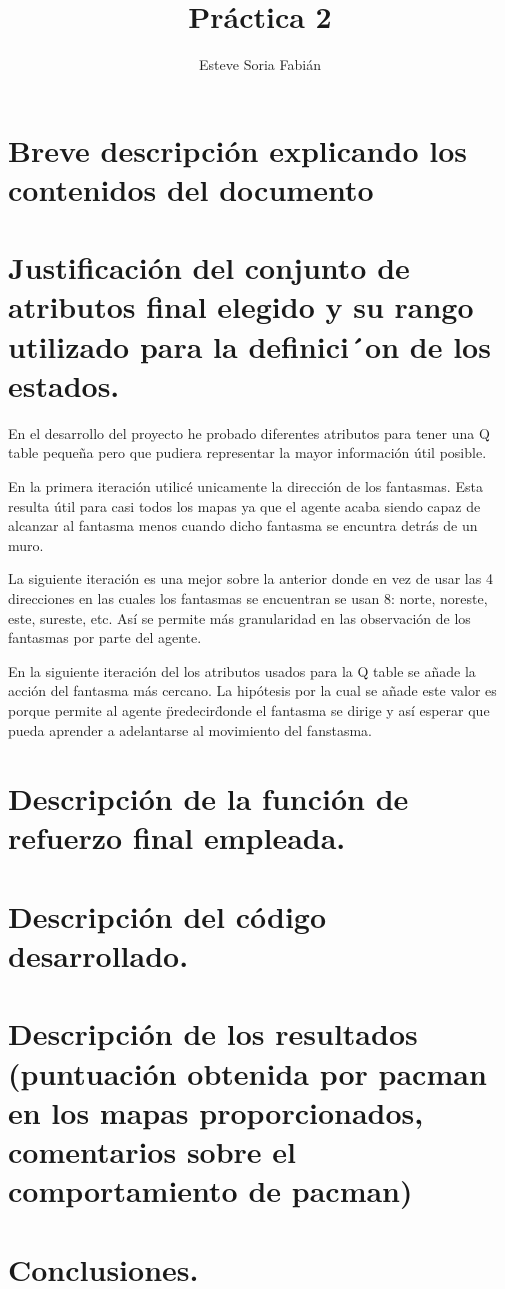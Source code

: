 \documentclass[12pt]{article}
\title{Práctica 2}
\author{Esteve Soria Fabián}
\begin{document}
    \maketitle


    \section{Breve descripción explicando los contenidos del documento}
    \section{Justificación del conjunto de atributos final elegido y su rango utilizado para la definici´on de los
    estados.}

    En el desarrollo del proyecto he probado diferentes atributos para tener una
    Q table pequeña pero que pudiera representar la mayor información útil posible.

    En la primera iteración utilicé unicamente la dirección de los fantasmas.
    Esta resulta útil para casi todos los mapas ya que el agente acaba siendo capaz
    de alcanzar al fantasma menos cuando dicho fantasma se encuntra detrás de un muro.

    La siguiente iteración es una mejor sobre la anterior donde en vez de usar las
    4 direcciones en las cuales los fantasmas se encuentran se usan 8: norte, noreste,
    este, sureste, etc.
    Así se permite más granularidad en las observación de los fantasmas por
    parte del agente.

    En la siguiente iteración del los atributos usados para la Q table se añade
    la acción del fantasma más cercano.
    La hipótesis por la cual se añade este valor es porque permite al agente
    \"predecir\" donde el fantasma se dirige y así esperar que pueda aprender a
    adelantarse al movimiento del fanstasma.




    \section{Descripción de la función de refuerzo final empleada.}


    \section{Descripción del código desarrollado.}
    \section{Descripción de los resultados (puntuación obtenida por pacman en los mapas proporcionados, comentarios
    sobre el comportamiento de pacman)}


    \section{Conclusiones.}
\end{document}
